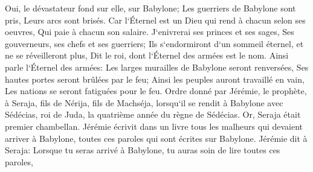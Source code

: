 \verse Oui, le dévastateur fond sur elle, sur Babylone; Les guerriers de Babylone sont pris, Leurs arcs sont brisés. Car l`Éternel est un Dieu qui rend à chacun selon ses oeuvres, Qui paie à chacun son salaire. 
\verse J`enivrerai ses princes et ses sages, Ses gouverneurs, ses chefs et ses guerriers; Ils s`endormiront d`un sommeil éternel, et ne se réveilleront plus, Dit le roi, dont l`Éternel des armées est le nom. 
\verse Ainsi parle l`Éternel des armées: Les larges murailles de Babylone seront renversées, Ses hautes portes seront brûlées par le feu; Ainsi les peuples auront travaillé en vain, Les nations se seront fatiguées pour le feu. 
\verse Ordre donné par Jérémie, le prophète, à Seraja, fils de Nérija, fils de Machséja, lorsqu`il se rendit à Babylone avec Sédécias, roi de Juda, la quatrième année du règne de Sédécias. Or, Seraja était premier chambellan. 
\verse Jérémie écrivit dans un livre tous les malheurs qui devaient arriver à Babylone, toutes ces paroles qui sont écrites sur Babylone. 
\verse Jérémie dit à Seraja: Lorsque tu seras arrivé à Babylone, tu auras soin de lire toutes ces paroles, 
